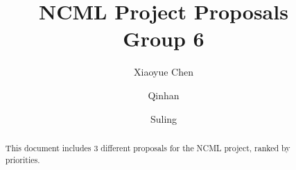 \documentclass{article}
\title{NCML Project Proposals\\Group 6}
\author{Xiaoyue Chen \and Qinhan \and Suling}
\begin{document}
\maketitle

\begin{abstract}
	This document includes 3 different proposals for the NCML project, ranked by
	priorities.
\end{abstract}




\end{document}
